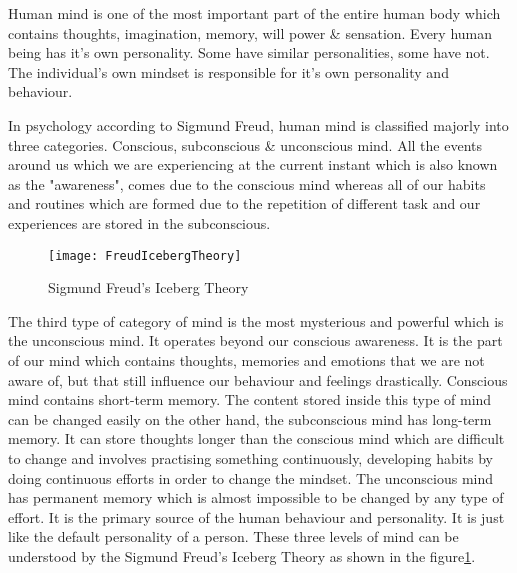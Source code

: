 Human mind is one of the most important part of the entire human body which contains thoughts, imagination, memory, will power \& sensation. Every human being has it's own personality. Some have similar personalities, some have not. The individual's own mindset is responsible for it's own personality and behaviour.

In psychology according to Sigmund Freud, human mind is classified majorly into three categories. Conscious, subconscious \& unconscious mind. All the events around us which we are experiencing at the current instant which is also known as the "awareness", comes due to the conscious mind whereas all of our habits and routines which are formed due to the repetition of different task and our experiences are stored in the subconscious.
 
\begin{figure}[H]
	\texttt{[image: FreudIcebergTheory]}
	\caption{Sigmund Freud's Iceberg Theory}
	\label{Fig:fig1}
\end{figure}

The third type of category of mind is the most mysterious and powerful which is the unconscious mind. It operates beyond our conscious awareness. It is the part of our mind which contains thoughts, memories and emotions that we are not aware of, but that still influence our behaviour and feelings drastically. Conscious mind contains short-term memory. The content stored inside this type of mind can be changed easily on the other hand, the subconscious mind has long-term memory. It can store thoughts longer than the conscious mind which are difficult to change and involves practising something continuously, developing habits by doing continuous efforts in order to change the mindset. The unconscious mind has permanent memory which is almost impossible to be changed by any type of effort. It is the primary source of the human behaviour and personality. It is just like the default personality of a person. These three levels of mind can be understood by the Sigmund Freud's Iceberg Theory as shown in the figure\ref{Fig:fig1}.
